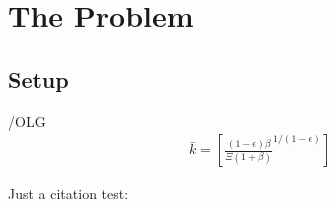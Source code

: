 \documentclass[ProjectDLO]{subfiles}
\begin{document}
{\titlepagefinish}

\hypertarget{Introduction}{}




\hypertarget{The-Problem}{}

\section{The Problem}

\subsection{Setup}\label{subsec:Setup}


\begin{verbatimwrite}{\EqDir/OLG}
  \begin{align}%
    \bar{k} = \left[\frac{(1-\epsilon)\beta}{\Xi (1+\beta)}^{1/(1-\epsilon)} \right]
  \end{align}
\end{verbatimwrite}




\hypertarget{PF-Constrained-Solution}{}
\hypertarget{Constrained-Solution}{}







Just a citation test: \cite{DostenTest}
\cite{friedmanATheory}




\end{document}
